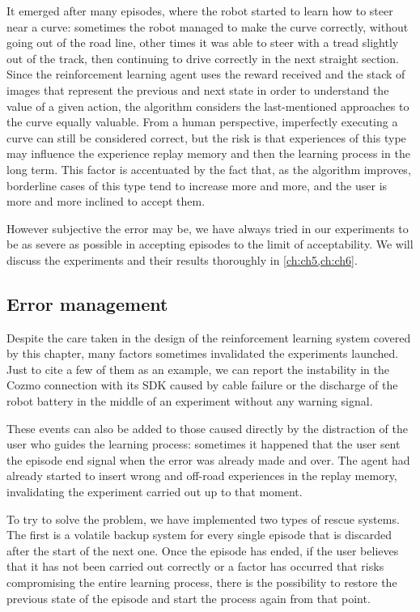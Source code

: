 It emerged after many episodes, where the robot started to learn how to steer near a curve: sometimes the robot managed to make the curve correctly, without going out of the road line, other times it was able to steer with a tread slightly out of the track, then continuing to drive correctly in the next straight section.
Since the reinforcement learning agent uses the reward received and the stack of images that represent the previous and next state in order to understand the value of a given action, the algorithm considers the last-mentioned approaches to the curve equally valuable.
From a human perspective, imperfectly executing a curve can still be considered correct, but the risk is that experiences of this type may influence the experience replay memory and then the learning process in the long term.
This factor is accentuated by the fact that, as the algorithm improves, borderline cases of this type tend to increase more and more, and the user is more and more inclined to accept them.

However subjective the error may be, we have always tried in our experiments to be as severe as possible in accepting episodes to the limit of acceptability.
We will discuss the experiments and their results thoroughly in \vref{ch:ch5,ch:ch6}.

\subsection{Error management} \label{subsec:error-management}

Despite the care taken in the design of the reinforcement learning system covered by this chapter, many factors sometimes invalidated the experiments launched.
Just to cite a few of them as an example, we can report the instability in the Cozmo connection with its SDK caused by cable failure or the discharge of the robot battery in the middle of an experiment without any warning signal.

These events can also be added to those caused directly by the distraction of the user who guides the learning process: sometimes it happened that the user sent the episode end signal when the error was already made and over.
The agent had already started to insert wrong and off-road experiences in the replay memory, invalidating the experiment carried out up to that moment.

To try to solve the problem, we have implemented two types of rescue systems.
The first is a volatile backup system for every single episode that is discarded after the start of the next one.
Once the episode has ended, if the user believes that it has not been carried out correctly or a factor has occurred that risks compromising the entire learning process, there is the possibility to restore the previous state of the episode and start the process again from that point.

